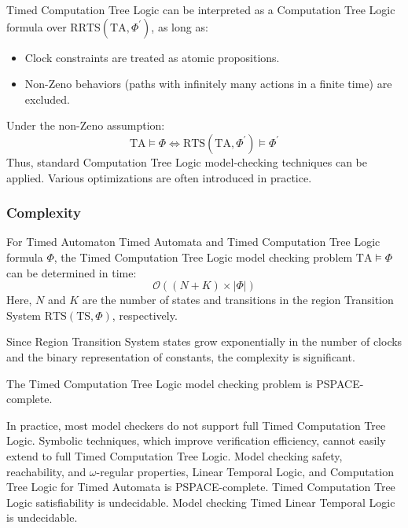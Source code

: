 Timed Computation Tree Logic can be interpreted as a Computation Tree Logic formula over R$\text{RTS}(\text{TA},\Phi^\prime)$, as long as:
\begin{itemize}
    \item Clock constraints are treated as atomic propositions.
    \item Non-Zeno behaviors (paths with infinitely many actions in a finite time) are excluded.
\end{itemize}
\noindent Under the non-Zeno assumption:
\[\text{TA}\models\Phi\Leftrightarrow\text{RTS}(\text{TA},\Phi^\prime)\models\Phi^\prime\]
\noindent Thus, standard Computation Tree Logic model-checking techniques can be applied. Various optimizations are often introduced in practice.

\subsubsection{Complexity}
\begin{theorem}
    For Timed Automaton Timed Automata and Timed Computation Tree Logic formula $\Phi$, the Timed Computation Tree Logic model checking problem $\text{TA}\models\Phi$ can be determined in time: 
    \[\mathcal{O}((N+K)\times\left\lvert \Phi\right\rvert )\] 
    Here, $N$ and $K$ are the number of states and transitions in the region Transition System $\text{RTS}(\text{TS},\Phi)$, respectively. 
\end{theorem}
\noindent Since Region Transition System states grow exponentially in the number of clocks and the binary representation of constants, the complexity is significant.
\begin{theorem}
    The Timed Computation Tree Logic model checking problem is PSPACE-complete.
\end{theorem}

In practice, most model checkers do not support full Timed Computation Tree Logic.
Symbolic techniques, which improve verification efficiency, cannot easily extend to full Timed Computation Tree Logic.
Model checking safety, reachability, and $\omega$-regular properties, Linear Temporal Logic, and Computation Tree Logic for Timed Automata is PSPACE-complete.
Timed Computation Tree Logic satisfiability is undecidable.
Model checking Timed Linear Temporal Logic is undecidable.